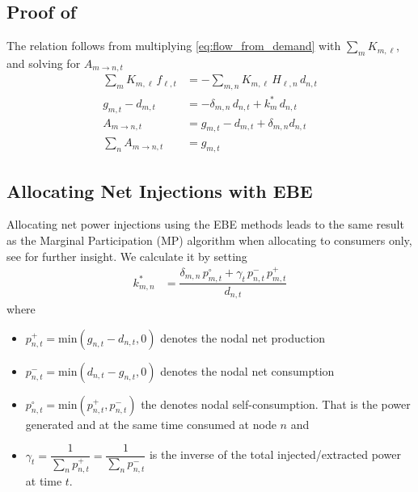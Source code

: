 \documentclass[11pt,twocolumn]{article}
\newcommand{\nodalgeneration}[1][n]{g_{#1,t}}
\newcommand{\nodaldemand}[1][n]{d_{#1,t}}
\newcommand{\incidence}[1][n]{K_{#1,\ell}}
\newcommand{\ptdf}[1][n]{H_{\ell,#1}}
\newcommand{\slackk}[1][n]{k^*_{#1}}
\newcommand{\Slackk}{k^*_{m,n}}
\newcommand{\flow}{f_{\ell,t}}
\newcommand{\injection}{p_{n,t}}
\newcommand{\netconsumption}[1][n]{p^{-}_{#1,t}}
\newcommand{\netproduction}[1][n]{p^{+}_{#1,t}}
\newcommand{\selfconsumption}[1][n]{p^{\circ}_{#1,t}}
\newcommand{\allocatePeer}[1][m \rightarrow n]{A_{#1,t}}
\begin{document}
\subsection{\texorpdfstring{Proof of }{Second proof}}
\label{sec:proof_sum_n_allocate_peer}
The relation follows from multiplying \cref{eq:flow_from_demand} with $\sum_m \incidence[m]$, and solving for $\allocatePeer$
\begin{align*}
\sum_m \incidence[m] \, \flow &= - \sum_{m,n} \incidence[m] \, \ptdf \, \nodaldemand \\
\nodalgeneration[m] - \nodaldemand[m] &= - \delta_{m,n} \, \nodaldemand + \slackk[m] \, \nodaldemand    \\
\allocatePeer &= \nodalgeneration[m] - \nodaldemand[m] + \delta_{m,n} \nodaldemand \\
\sum_n \allocatePeer &= \nodalgeneration[m]
\end{align*}


\subsection{Allocating Net Injections with EBE}
\label{sec:net_ebe}

Allocating net power injections using the EBE methods leads to the same result as the Marginal Participation (MP) \cite{rudnick_marginal_1995}  algorithm when allocating to consumers only, see \cite{hofmann_flow_2020-1} for further insight. We calculate it by setting 
\begin{align}
\Slackk &= \dfrac{ \delta_{m,n}\,\selfconsumption[m] + \gamma_t \, \netconsumption  \, \netproduction[m]}{\nodaldemand}
\label{eq:mp_slack}
\end{align}
where 
\begin{itemize}
\item $\netproduction = \text{min}\left( \nodalgeneration - \nodaldemand , 0 \right) $ denotes the nodal net production 
\item $\netconsumption = \text{min}\left( \nodaldemand  - \nodalgeneration, 0 \right)$ denotes the nodal net consumption
\item $\selfconsumption = \text{min}\left( \netproduction, \netconsumption \right)$ the denotes  nodal self-consumption. That is the power generated and at the same time consumed at node $n$ and 
\item $\gamma_t = \dfrac{1}{\sum_n \netproduction} = \dfrac{1}{\sum_n \netconsumption}$ is the inverse of the total injected/extracted power at time $t$.
\end{itemize}
\end{document}
